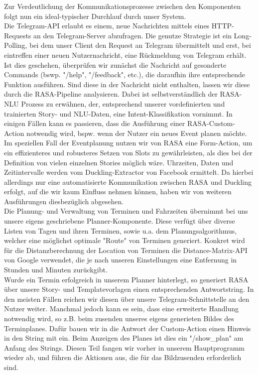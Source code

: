 Zur Verdeutlichung der Kommunikationsprozesse zwischen den Komponenten folgt nun ein ideal-typischer Durchlauf durch unser System.\\

Die Telegram-API erlaubt es einem, neue Nachrichten mittels eines HTTP-Requests an den Telegram-Server abzufragen. Die genutze Strategie ist ein Long-Polling, bei dem unser Client den Request an Telegram übermittelt und erst, bei eintreffen einer neuen Nutzernachricht, eine Rückmeldung von Telegram erhält. Ist dies geschehen, überprüfen wir zunächst die Nachricht auf gesonderte Commands (bswp. "/help", "/feedback", etc.), die daraufhin ihre entsprechende Funktion ausführen. Sind diese in der Nachricht nicht enthalten, lassen wir diese durch die RASA-Pipeline analysieren. Dabei ist selbstverständlich der RASA-NLU Prozess zu erwähnen, der, entsprechend unserer vordefinierten und trainierten Story- und NLU-Daten, eine Intent-Klassifikation vornimmt. In einigen Fällen kann es passieren, dass die Ausführung einer RASA-Custom-Action notwendig wird, bspw. wenn der Nutzer ein neues Event planen möchte. Im speziellen Fall der Eventplanung nutzen wir von RASA eine Form-Action, um ein effizienteres und robusteres Setzen von Slots zu gewährleisten, als dies bei der Definition von vielen einzelnen Stories möglich wäre. Uhrzeiten, Daten und Zeitintervalle werden vom Duckling-Extractor von Facebook ermittelt. Da hierbei allerdings nur eine automatisierte Kommunikation zwischen RASA und Duckling erfolgt, auf die wir kaum Einfluss nehmen können, haben wir von weiteren Ausführungen diesbezüglich abgesehen.\\

Die Planung- und Verwaltung von Terminen und Fahrzeiten übernimmt bei uns unsere eigens geschriebene Planner-Komponente. Diese verfügt über diverse Listen von Tagen und ihren Terminen, sowie u.a. dem Planungsalgorithmus, welcher eine möglichst optimale "Route" von Terminen generiert.
Konkret wird für die Distanzberechnung der Location von Terminen die Distance-Matrix-API von Google verwendet, die je nach unseren Einstellungen eine Entfernung in Stunden und Minuten zurückgibt.\\

Wurde ein Termin erfolgreich in unserem Planner hinterlegt, so generiert RASA über unsere Story- und Templatevorlagen einen entsprechenden Antwortstring. In den meisten Fällen reichen wir diesen über unsere Telegram-Schnittstelle an den Nutzer weiter. Manchmal jedoch kann es sein, dass eine erweiterte Handlung notwendig wird, so z.B. beim zusenden unseres eigens generieten Bildes des Terminplanes. Dafür bauen wir in die Antwort der Custom-Action einen Hinweis in den String mit ein. Beim Anzeigen des Planes ist dies ein "/show\_plan" am Anfang des Strings. Diesen Teil fangen wir vorher in unserem Hauptprogramm wieder ab, und führen die Aktionen aus, die für das Bildzusenden erforderlich sind.

